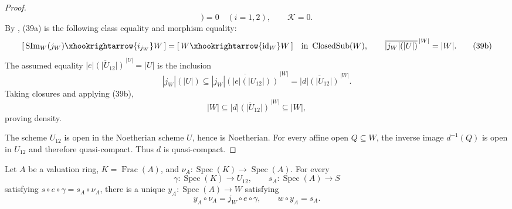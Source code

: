 \begin{proof}
\[        \bigr)=0
    \quad(i=1,2),
    \qquad
    \mathcal K=0.                                                 \tag{39a}
  \]
  By , (39a) is the following class
  equality and morphism equality:
  \[
    [\,\operatorname{SIm}_W(j_W)\xhookrightarrow{i_{j_W}}W\,]
      =[\,W\xhookrightarrow{\operatorname{id}_W}W\,]
      \quad\text{in }\operatorname{ClosedSub}(W),
    \qquad
    \overline{|j_W|(|U|)}^{\,|W|}=|W|.                            \tag{39b}
  \]
  The assumed equality
  $\overline{|e|(|U_{12}|)}^{\,|U|}=|U|$ is the inclusion
  \[
    |j_W|(|U|)
      \subseteq\overline{|j_W|(|e|(|U_{12}|))}^{\,|W|}
      =\overline{|d|(|U_{12}|)}^{\,|W|}.
  \]
  Taking closures and applying (39b),
  \[
    |W|
      \subseteq\overline{|d|(|U_{12}|)}^{\,|W|}
      \subseteq|W|,
  \]
  proving density.

  The scheme $U_{12}$ is open in the Noetherian scheme $U$, hence is
  Noetherian.  For every affine open $Q\subseteq W$, the inverse image
  $d^{-1}(Q)$ is open in $U_{12}$ and therefore quasi-compact.  Thus $d$ is
  quasi-compact.
\end{proof}

\begin{lemma}
  \label{lemma:nagata-two-open-valuative-lifting}

  Let $A$ be a valuation ring, $K=\operatorname{Frac}(A)$, and
  $\nu_A\colon\operatorname{Spec}(K)\to\operatorname{Spec}(A)$.  For every
  \[
    \gamma\colon\operatorname{Spec}(K)\to U_{12},\qquad
    s_A\colon\operatorname{Spec}(A)\to S
  \]
  satisfying $s\circ e\circ\gamma=s_A\circ\nu_A$, there is a unique
  $y_A\colon\operatorname{Spec}(A)\to W$ satisfying
  \[
    y_A\circ\nu_A=j_W\circ e\circ\gamma,\qquad
    w\circ y_A=s_A.
  \]
\end{lemma}

